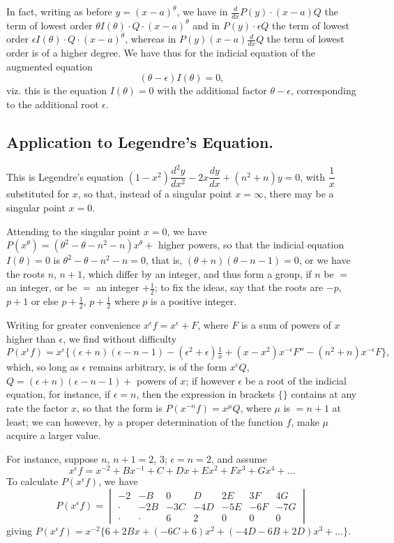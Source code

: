\documentclass[11pt,a4paper]{book}
\begin{document}
In fact, writing as before $y = (x - a)^\theta$, we have in $\tfrac{d}{dx}P(y) \cdot (x - a)Q$ the term of lowest order $\theta I(\theta) \cdot Q \cdot (x - a)^\theta$ and in $P(y) \cdot \epsilon Q$ the term of lowest order $\epsilon I(\theta) \cdot Q \cdot (x - a)^\theta$, whereas in $P(y)(x - a)\tfrac{d}{dx}Q$ the term of lowest order is of a higher degree. We have thus for the indicial equation of the augmented equation
\[
(\theta - \epsilon)I(\theta) = 0,
\]
viz. this is the equation $I(\theta) = 0$ with the additional factor $\theta - \epsilon$, corresponding to the additional root $\epsilon$.

\subsection*{Application to Legendre's Equation.}

This is Legendre's equation $(1 - x^2)\dfrac{d^2y}{dx^2} - 2x\dfrac{dy}{dx} + (n^2 + n)y = 0$, with $\dfrac{1}{x}$ substituted for $x$, so that, instead of a singular point $x = \infty$, there may be a singular point $x = 0$.

Attending to the singular point $x = 0$, we have $P(x^\theta) = (\theta^2 - \theta - n^2 - n)x^\theta +$ higher powers, so that the indicial equation $I(\theta) = 0$ is $\theta^2 - \theta - n^2 - n = 0$, that is, $(\theta + n)(\theta - n - 1) = 0$, or we have the roots $n$, $n + 1$, which differ by an integer, and thus form a group, if $n$ be $=$ an integer, or be $=$ an integer $+ \tfrac{1}{2}$; to fix the ideas, say that the roots are $-p$, $p + 1$ or else $p + \tfrac{1}{2}$, $p + \tfrac{1}{2}$ where $p$ is a positive integer.

Writing for greater convenience $x^\epsilon f = x^\epsilon + F$, where $F$ is a sum of powers of $x$ higher than $\epsilon$, we find without difficulty
\[
P(x^\epsilon f) = x^\epsilon\{(\epsilon + n)(\epsilon - n - 1) - (\epsilon^2 + \epsilon)\tfrac{1}{x} + (x - x^2)x^{-\epsilon}F'' - (n^2 + n)x^{-\epsilon}F\},
\]
which, so long as $\epsilon$ remains arbitrary, is of the form $x^\epsilon Q$, $Q = (\epsilon + n)(\epsilon - n - 1) +$ powers of $x$; if however $\epsilon$ be a root of the indicial equation, for instance, if $\epsilon = n$, then the expression in brackets $\{\}$ contains at any rate the factor $x$, so that the form is $P(x^{-n}f) = x^\mu Q$, where $\mu$ is $= n + 1$ at least; we can however, by a proper determination of the function $f$, make $\mu$ acquire a larger value.

For instance, suppose $n$, $n + 1 = 2$, $3$; $\epsilon = n = 2$, and assume
\[
x^\epsilon f = x^{-2} + Bx^{-1} + C + Dx + Ex^2 + Fx^3 + Gx^4 + \ldots
\]
To calculate $P(x^\epsilon f)$, we have
\[
P(x^\epsilon f) = \begin{vmatrix}
-2 & -B & 0 & D & 2E & 3F & 4G \\
\cdot & -2B & -3C & -4D & -5E & -6F & -7G \\
\cdot & \cdot & 6 & 2 & 0 & 0 & 0
\end{vmatrix}
\]
giving $P(x^\epsilon f) = x^{-2}\{6 + 2Bx + (-6C + 6)x^2 + (-4D - 6B + 2D)x^3 + \ldots\}$.
\end{document}
